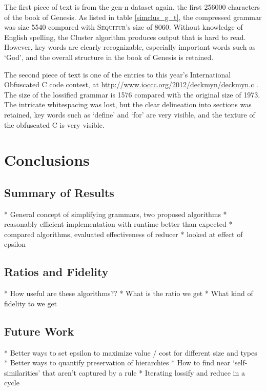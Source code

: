 \documentclass[11pt]{article}
\newcommand{\Sequitur}{\textsc{Sequitur}\xspace}
\begin{document}
The first piece of text is from the gen-n dataset again, the first 256000
characters of the book of Genesis. As listed in table \ref{simclus_g_t}, the
compressed grammar was size 5540 compared with \Sequitur's size of 8060.
Without knowledge of English spelling, the Cluster algorithm produces output
that is hard to read. However, key words are clearly recognizable, especially
important words such as `God', and the overall structure in the book of Genesis
is retained.

The second piece of text is one of the entries to this year's International
Obfuscated C code contest, at \url{http://www.ioccc.org/2012/deckmyn/deckmyn.c}
.  The size of the lossified grammar is 1576 compared with the original size of
1973. The intricate whitespacing was lost, but the clear delineation into
sections was retained, key words such as `define' and `for' are very visible,
and the texture of the obfuscated C is very visible.

\section{Conclusions}

\subsection{Summary of Results}

* General concept of simplifying grammars, two proposed algorithms
* reasonably efficient implementation with runtime better than expected
* compared algorithms, evaluated effectiveness of reducer
* looked at effect of epsilon

\subsection{Ratios and Fidelity}

* How useful are these algorithms??
* What is the ratio we get
* What kind of fidelity to we get

\subsection{Future Work}
* Better ways to set epsilon to maximize value / cost for different size and types
* Better ways to quantify preservation of hierarchies
* How to find near `self-similarities' that aren't captured by a rule
* Iterating lossify and reduce in a cycle

\pagebreak
\end{document}
